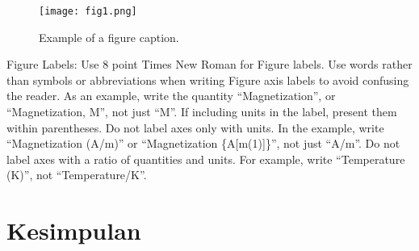 \documentclass[conference]{IEEEtran}
\begin{document}
\begin{figure}[htbp]
\centerline{\texttt{[image: fig1.png]}}
\caption{Example of a figure caption.}
\label{fig}
\end{figure}

Figure Labels: Use 8 point Times New Roman for Figure labels. Use words 
rather than symbols or abbreviations when writing Figure axis labels to 
avoid confusing the reader. As an example, write the quantity 
``Magnetization'', or ``Magnetization, M'', not just ``M''. If including 
units in the label, present them within parentheses. Do not label axes only 
with units. In the example, write ``Magnetization (A/m)'' or ``Magnetization 
\{A[m(1)]\}'', not just ``A/m''. Do not label axes with a ratio of 
quantities and units. For example, write ``Temperature (K)'', not 
``Temperature/K''.

\section{Kesimpulan}
\section*{}


\end{document}
